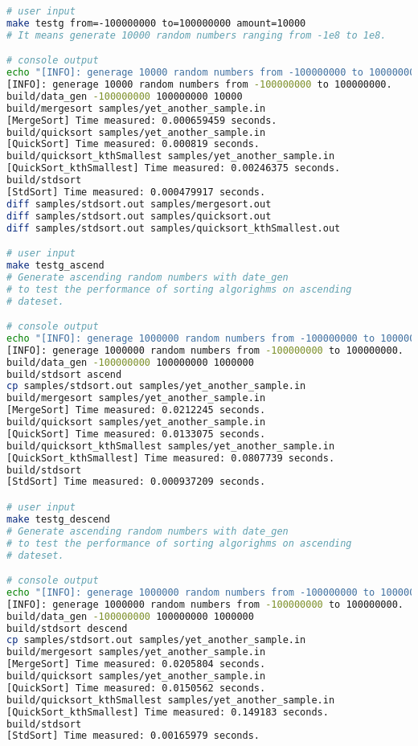 \begin{lstlisting}[language=bash]
# user input
make testg from=-100000000 to=100000000 amount=10000
# It means generate 10000 random numbers ranging from -1e8 to 1e8.

# console output
echo "[INFO]: generage 10000 random numbers from -100000000 to 100000000."
[INFO]: generage 10000 random numbers from -100000000 to 100000000.
build/data_gen -100000000 100000000 10000
build/mergesort samples/yet_another_sample.in
[MergeSort] Time measured: 0.000659459 seconds.
build/quicksort samples/yet_another_sample.in
[QuickSort] Time measured: 0.000819 seconds.
build/quicksort_kthSmallest samples/yet_another_sample.in
[QuickSort_kthSmallest] Time measured: 0.00246375 seconds.
build/stdsort
[StdSort] Time measured: 0.000479917 seconds.
diff samples/stdsort.out samples/mergesort.out
diff samples/stdsort.out samples/quicksort.out
diff samples/stdsort.out samples/quicksort_kthSmallest.out

# user input
make testg_ascend 
# Generate ascending random numbers with date_gen
# to test the performance of sorting algorighms on ascending
# dateset.

# console output
echo "[INFO]: generage 1000000 random numbers from -100000000 to 100000000."
[INFO]: generage 1000000 random numbers from -100000000 to 100000000.
build/data_gen -100000000 100000000 1000000
build/stdsort ascend
cp samples/stdsort.out samples/yet_another_sample.in
build/mergesort samples/yet_another_sample.in
[MergeSort] Time measured: 0.0212245 seconds.
build/quicksort samples/yet_another_sample.in
[QuickSort] Time measured: 0.0133075 seconds.
build/quicksort_kthSmallest samples/yet_another_sample.in
[QuickSort_kthSmallest] Time measured: 0.0807739 seconds.
build/stdsort
[StdSort] Time measured: 0.000937209 seconds.

# user input
make testg_descend
# Generate ascending random numbers with date_gen
# to test the performance of sorting algorighms on ascending
# dateset.

# console output
echo "[INFO]: generage 1000000 random numbers from -100000000 to 100000000."
[INFO]: generage 1000000 random numbers from -100000000 to 100000000.
build/data_gen -100000000 100000000 1000000
build/stdsort descend
cp samples/stdsort.out samples/yet_another_sample.in
build/mergesort samples/yet_another_sample.in
[MergeSort] Time measured: 0.0205804 seconds.
build/quicksort samples/yet_another_sample.in
[QuickSort] Time measured: 0.0150562 seconds.
build/quicksort_kthSmallest samples/yet_another_sample.in
[QuickSort_kthSmallest] Time measured: 0.149183 seconds.
build/stdsort
[StdSort] Time measured: 0.00165979 seconds.

\end{lstlisting}
